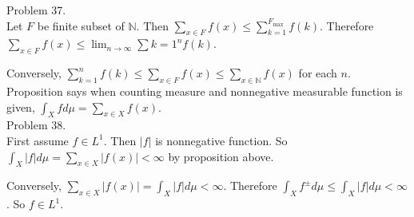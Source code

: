 Problem 37. \\

Let $F$ be finite subset of $\mathbb{N}$. Then $\sum_{x\in F} f(x) \leq \sum_{k=1}^{F_{\text{max} } } f(k) $. Therefore $\sum_{x\in F} f(x) \leq \lim_{n\rightarrow \infty } \sum{k=1}^{n}f(k)$.

Conversely, $\sum_{k=1}^{n}f(k) \leq \sum_{x\in F}f(x) \leq \sum_{x\in \mathbb{N}}f(x)$ for each $n$. \\

Proposition says when counting measure and nonnegative measurable function is given, $\int_{X}f d\mu = \sum_{x\in X}f(x)$. \\

Problem 38. \\

First assume $f \in L^1$. Then $\left| f  \right |$ is nonnegative function. So $\int_{X} \left | f  \right | d\mu = \sum_{x\in X} \left| f(x)  \right | < \infty$ by proposition above.

Conversely, $\sum_{x\in X} \left | f(x)  \right | = \int_{X} \left| f  \right | d\mu < \infty$. Therefore $\int_{X} f^{\pm} d\mu \leq \int_{X}\left | f  \right | d\mu < \infty$. So $f \in L^1$.\\



